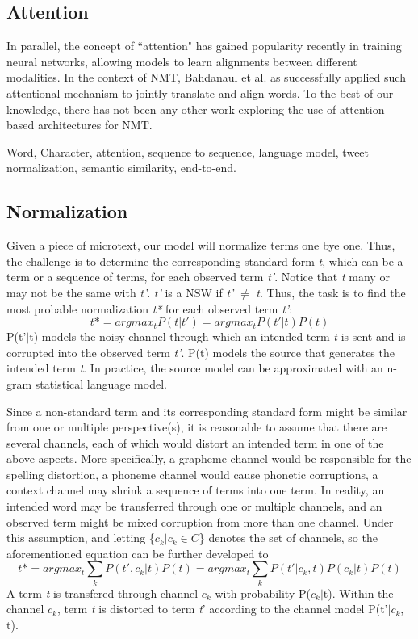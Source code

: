 \documentclass[letterpaper]{article}
\begin{document}
\subsection{Attention}
In parallel, the concept of ``attention" has gained popularity recently in training neural networks, allowing models to learn alignments between different modalities. In the context of NMT, Bahdanaul et al.  as successfully applied such attentional mechanism to jointly translate and align words. To the best of our knowledge, there has not been any other work exploring the use of attention-based architectures for NMT.

Word, Character, attention, sequence to sequence, language model, tweet normalization, semantic similarity, end-to-end.

\subsection{Normalization}
Given a piece of microtext, our model will normalize terms one bye one. Thus, the challenge is to determine the corresponding standard form \textit{t}, which can be a term or a sequence of terms, for each observed term \textit{t'}. Notice that \textit{t} many or may not be the same with \textit{t'}. \textit{t'} is a NSW if \textit{t'} $\neq$ \textit{t}. Thus, the task is to find the most probable normalization \textit{t*} for each observed term \textit{t'}:
\begin{equation}\label{key}
t*=argmax_{t}P(t|t')=argmax_{t}P(t'|t)P(t)
\end{equation}
P(t'$|$t) models the noisy channel through which an intended term \textit{t} is sent and is corrupted into the observed term \textit{t'}. P(t) models the source that generates the intended term \textit{t}. In practice, the source model can be approximated with an n-gram statistical language model.

Since a non-standard term and its corresponding standard form might be similar from one or multiple perspective(s), it is reasonable to assume that there are several channels, each of which would distort an intended term in one of the above aspects. More specifically, a grapheme channel would be responsible for the spelling distortion, a phoneme channel would cause phonetic corruptions, a context channel may shrink a sequence of terms into one term. In reality, an intended word may be transferred through one or multiple channels, and an observed term might be mixed corruption from more than one channel. Under this assumption, and letting \{\textit{$c_{k}$}$|$\textit{$c_{k} \in C$}\} denotes the set of channels, so the aforementioned equation can be further developed to 
\begin{equation}\label{key}
t*= argmax_{t}\sum_{k}P(t',c_{k}|t)P(t)
  = argmax_{t}\sum_{k}P(t'|c_{k},t)P(c_{k}|t)P(t)
\end{equation}
A term \textit{t} is transfered through channel \textit{$c_{k}$} with probability P($c_{k}|$t). Within the channel \textit{$c_{k}$}, term \textit{t} is distorted to term \textit{t}' according to the channel model P(t'$|c_{k}$, t).
\end{document}
